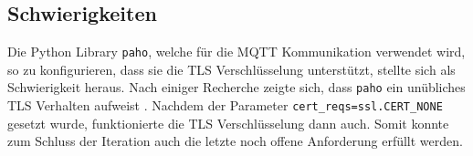 \subsection{Schwierigkeiten}
Die Python Library \texttt{paho}, welche für die \ac{MQTT} Kommunikation verwendet wird, so zu konfigurieren,
dass sie die \ac{TLS} Verschlüsselung unterstützt, stellte sich als Schwierigkeit heraus.
Nach einiger Recherche zeigte sich, dass \texttt{paho} ein unübliches \ac{TLS}
Verhalten aufweist \parencite{eclipse_paho_ssl_2019}.
Nachdem der Parameter \texttt{cert\_reqs=ssl.CERT\_NONE} gesetzt wurde, funktionierte
die \ac{TLS} Verschlüsselung dann auch.
Somit konnte zum Schluss der Iteration auch die letzte noch offene Anforderung erfüllt werden.